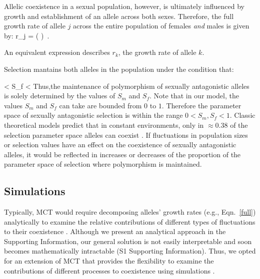 \documentclass[12pt]{article}
\let\oldequation\equation
\let\oldendequation\endequation
\renewenvironment{equation}
  {\linenomathNonumbers\oldequation}
  {\oldendequation\endlinenomath}
\begin{document}
 Allelic coexistence in a sexual population, however, is ultimately influenced by growth and establishment of an allele across both sexes. Therefore, the full growth rate of allele $j$ across the entire population of females \emph{and} males is given by:
 \begin{equation}
     r_{j} = \ln \left(   \right) \,.
     \label{full}
 \end{equation}

An equivalent expression describes $r_{k}$, the growth rate of allele $k$.

Selection mantains both alleles in the population under the condition that:

\begin{equation}
 < S_{f} < 
\label{selection}
\end{equation}
Thus,the maintenance of polymorphism of sexually antagonistic alleles is solely determined by the values of $S_{m}$ and $S_{f}$. Note that in our model, the values $S_{m}$ and $S_{f}$ can take are bounded from $0$ to $1$. Therefore the parameter space of sexually antagonistic selection is within the range $ 0< S_{m}, S_{f} < 1$. Classic theoretical models predict that in constant environments, only in $\approx 0.38$ of the selection parameter space alleles can coexist \citep{kidwell1977regions,pamilo1979genic,connallon_evolutionary_2018}.  If fluctuations in population sizes or selection values have an effect on the coexistence of sexually antagonistic alleles, it would be reflected in increases or decreases of the proportion of the parameter space of selection where polymorphism is maintained.



\subsection*{Simulations}

Typically, MCT would require decomposing alleles' growth rates (e.g., Eqn.~\ref{full}) analytically to examine the relative contributions of different types of fluctuations to their coexistence \citep{barabas_chessons_2018}. Although we present an analytical approach in the Supporting Information, our general solution is not easily interpretable and soon becomes mathematically intractable (S1 Supporting Information). Thus, we opted for an extension of MCT that provides the flexibility to examine the contributions of different processes to coexistence using simulations \citep{ellner_expanded_2019, shoemaker2020}.
\end{document}
